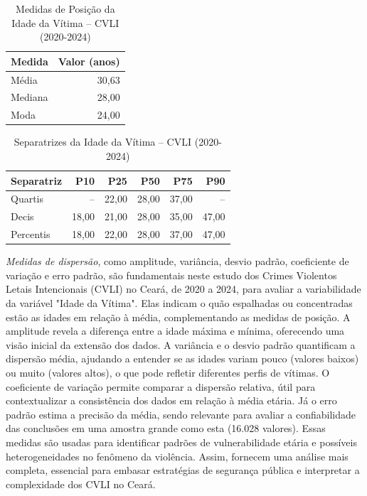 \documentclass{exam}
\begin{document}
\begin{questions}
\begin{table}[H]
    \centering
    \begin{tabular}{lr}
        \toprule
        \textbf{Medida} & \textbf{Valor (anos)} \\ 
        \midrule
        Média & 30,63 \\ 
        Mediana & 28,00 \\ 
        Moda & 24,00 \\ 
        \bottomrule
    \end{tabular}
    \caption{Medidas de Posição da Idade da Vítima -- CVLI (2020-2024)}
    \label{tab:medidas_posicao_idade}
\end{table}

\begin{table}[H]
    \centering
    \begin{tabular}{lrrrrr}
        \toprule
        \textbf{Separatriz} & \textbf{P10} & \textbf{P25} & \textbf{P50} & \textbf{P75} & \textbf{P90} \\ 
        \midrule
        Quartis & -- & 22,00 & 28,00 & 37,00 & -- \\ 
        Decis & 18,00 & 21,00 & 28,00 & 35,00 & 47,00 \\ 
        Percentis & 18,00 & 22,00 & 28,00 & 37,00 & 47,00 \\ 
        \bottomrule
    \end{tabular}
    \caption{Separatrizes da Idade da Vítima -- CVLI (2020-2024)}
    \label{tab:separatrizes_idade}
\end{table}

\question 
\textit{Medidas de dispersão}, como amplitude, variância, desvio padrão, coeficiente de variação e erro padrão, são fundamentais neste estudo dos Crimes Violentos Letais Intencionais (CVLI) no Ceará, de 2020 a 2024, para avaliar a variabilidade da variável "Idade da Vítima". Elas indicam o quão espalhadas ou concentradas estão as idades em relação à média, complementando as medidas de posição. A amplitude revela a diferença entre a idade máxima e mínima, oferecendo uma visão inicial da extensão dos dados. A variância e o desvio padrão quantificam a dispersão média, ajudando a entender se as idades variam pouco (valores baixos) ou muito (valores altos), o que pode refletir diferentes perfis de vítimas. O coeficiente de variação permite comparar a dispersão relativa, útil para contextualizar a consistência dos dados em relação à média etária. Já o erro padrão estima a precisão da média, sendo relevante para avaliar a confiabilidade das conclusões em uma amostra grande como esta (16.028 valores). Essas medidas são usadas para identificar padrões de vulnerabilidade etária e possíveis heterogeneidades no fenômeno da violência. Assim, fornecem uma análise mais completa, essencial para embasar estratégias de segurança pública e interpretar a complexidade dos CVLI no Ceará.


\end{questions}
\end{document}
